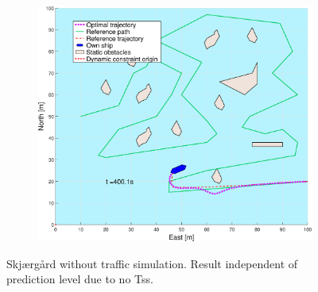 \begin{figure}[!ht]
\begin{subfigure}[b]{0.494\textwidth}
        \subcaption{}
    \end{subfigure}
    \hfill
    \begin{subfigure}[b]{0.494\textwidth}
        \centering
        \includegraphics[width=\textwidth]{Images/Figures/skjergard_u_trafikk/_Simple_0fig999_time=400}
        \subcaption{}
    \end{subfigure}
    \hfill
    \caption{Skjærgård without traffic simulation. Result independent of prediction level due to no \gls{Ts}s.}
    \label{FIG: Skjaergard without traffic}
\end{figure}%
